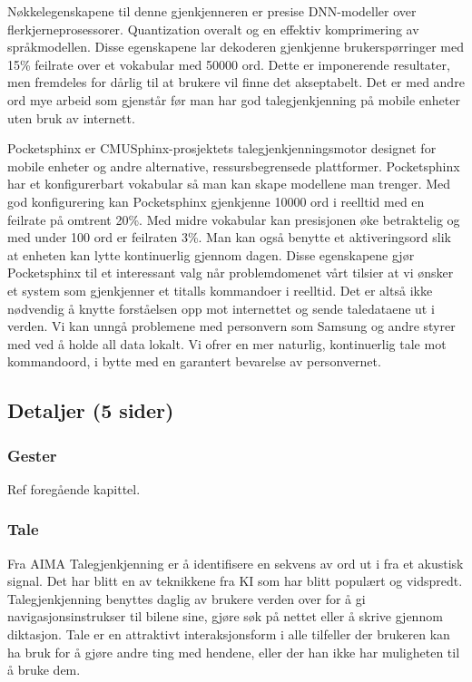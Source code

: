 Nøkkelegenskapene til denne gjenkjenneren er presise DNN-modeller over flerkjerneprosessorer. Quantization overalt og en effektiv komprimering av språkmodellen. Disse egenskapene lar dekoderen gjenkjenne brukerspørringer med 15\% feilrate over et vokabular med 50000 ord. Dette er imponerende resultater, men fremdeles for dårlig til at brukere vil finne det akseptabelt. Det er med andre ord mye arbeid som gjenstår før man har god talegjenkjenning på mobile enheter uten bruk av internett.

Pocketsphinx er CMUSphinx-prosjektets talegjenkjenningsmotor designet for mobile enheter og andre alternative, ressursbegrensede plattformer. Pocketsphinx har et konfigurerbart vokabular så man kan skape modellene man trenger. Med god konfigurering kan Pocketsphinx gjenkjenne 10000 ord i reelltid med en feilrate på omtrent 20\%. Med midre vokabular kan presisjonen øke betraktelig og med under 100 ord er feilraten 3\%. Man kan også benytte et aktiveringsord slik at enheten kan lytte kontinuerlig gjennom dagen. Disse egenskapene gjør Pocketsphinx til et interessant valg når problemdomenet vårt tilsier at vi ønsker et system som gjenkjenner et titalls kommandoer i reelltid. Det er altså ikke nødvendig å knytte forståelsen opp mot internettet og sende taledataene ut i verden. Vi kan unngå problemene med personvern som Samsung og andre styrer med ved å holde all data lokalt. Vi ofrer en mer naturlig, kontinuerlig tale mot kommandoord, i bytte med en garantert bevarelse av personvernet.

\subsection{Detaljer (5 sider)}

\subsubsection*{Gester}
Ref foregående kapittel.

\subsubsection*{Tale}

{\color{blue}Fra AIMA}
Talegjenkjenning er å identifisere en sekvens av ord ut i fra et akustisk signal. Det har blitt en av teknikkene fra KI som har blitt populært og vidspredt. Talegjenkjenning benyttes daglig av brukere verden over for å gi navigasjonsinstrukser til bilene sine, gjøre søk på nettet eller å skrive gjennom diktasjon. Tale er en attraktivt interaksjonsform i alle tilfeller der brukeren kan ha bruk for å gjøre andre ting med hendene, eller der han ikke har muligheten til å bruke dem.

